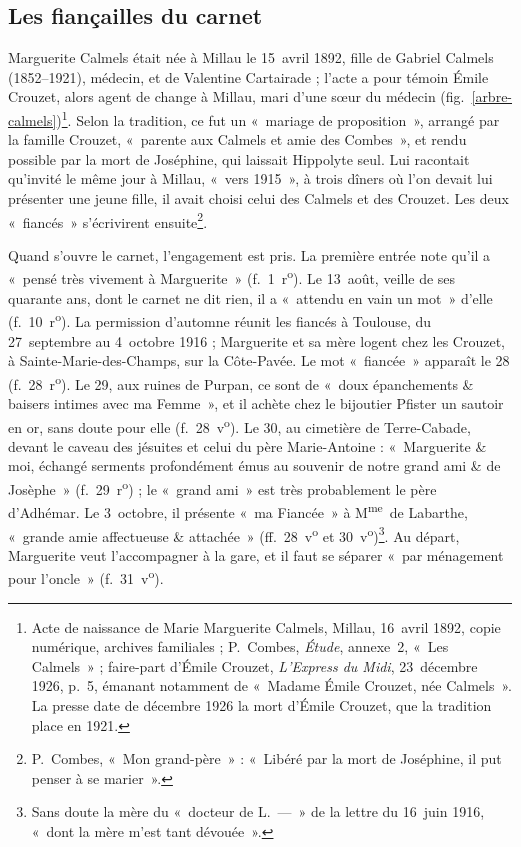 \subsection{Les fiançailles du carnet}

Marguerite Calmels était née à Millau le 15~avril 1892, fille de Gabriel Calmels (1852--1921), médecin, et de Valentine Cartairade ; l'acte a pour témoin Émile Crouzet, alors agent de change à Millau, mari d'une sœur du médecin (fig.~\ref{arbre-calmels})\footnote{Acte de naissance de Marie Marguerite Calmels, Millau, 16~avril 1892, copie numérique, archives familiales ; P.~Combes, \textit{Étude}, annexe~2, «~Les Calmels~» ; faire-part d'Émile Crouzet, \textit{L'Express du Midi}, 23~décembre 1926, p.~5, émanant notamment de «~Madame Émile Crouzet, née Calmels~». La presse date de décembre 1926 la mort d'Émile Crouzet, que la tradition place en 1921.}. Selon la tradition, ce fut un «~mariage de proposition~», arrangé par la famille Crouzet, «~parente aux Calmels et amie des Combes~», et rendu possible par la mort de Joséphine, qui laissait Hippolyte seul. Lui racontait qu'invité le même jour à Millau, «~vers 1915~», à trois dîners où l'on devait lui présenter une jeune fille, il avait choisi celui des Calmels et des Crouzet. Les deux «~fiancés~» s'écrivirent ensuite\footnote{P.~Combes, «~Mon grand-père~» : «~Libéré par la mort de Joséphine, il put penser à se marier~».}.

Quand s'ouvre le carnet, l'engagement est pris. La première entrée note qu'il a «~pensé très vivement à Marguerite~» (f.~1~r\textsuperscript{o}). Le 13~août, veille de ses quarante ans, dont le carnet ne dit rien, il a «~attendu en vain un mot~» d'elle (f.~10~r\textsuperscript{o}). La permission d'automne réunit les fiancés à Toulouse, du 27~septembre au 4~octobre 1916 ; Marguerite et sa mère logent chez les Crouzet, à Sainte-Marie-des-Champs, sur la Côte-Pavée. Le mot «~fiancée~» apparaît le 28 (f.~28~r\textsuperscript{o}). Le 29, aux ruines de Purpan, ce sont de «~doux épanchements \& baisers intimes avec ma Femme~», et il achète chez le bijoutier Pfister un sautoir en or, sans doute pour elle (f.~28~v\textsuperscript{o}). Le 30, au cimetière de Terre-Cabade, devant le caveau des jésuites et celui du père Marie-Antoine : «~Marguerite \& moi, échangé serments profondément émus au souvenir de notre grand ami \& de Josèphe~» (f.~29~r\textsuperscript{o}) ; le «~grand ami~» est très probablement le père d'Adhémar. Le 3~octobre, il présente «~ma Fiancée~» à M\textsuperscript{me}~de Labarthe, «~grande amie affectueuse \& attachée~» (ff.~28~v\textsuperscript{o} et 30~v\textsuperscript{o})\footnote{Sans doute la mère du «~docteur de L.~---~» de la lettre du 16~juin 1916, «~dont la mère m'est tant dévouée~».}. Au départ, Marguerite veut l'accompagner à la gare, et il faut se séparer «~par ménagement pour l'oncle~» (f.~31~v\textsuperscript{o}).

